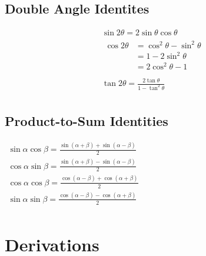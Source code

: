 \documentclass{article}
\begin{document}
\subsection{Double Angle Identites}
\begin{gather*}
	\hyperref[proof:sindouble]{
		\sin2\theta=2\sin\theta\cos\theta
	} \\
	\hyperref[proof:cosdouble]{
		\begin{aligned}
			\cos2\theta&=\cos^2\theta-\sin^2\theta \\
			&=1-2\sin^2\theta \\
			&=2\cos^2\theta-1 \\
		\end{aligned}
	} \\
	\hyperref[proof:tandouble]{
		\tan2\theta=\frac{2\tan\theta}{1-\tan^2\theta}
	} \\
\end{gather*}

\subsection{Product-to-Sum Identities}
\begin{center}
\hyperref[proof:p2s]{
	$\begin{aligned}
		\sin\alpha\cos\beta=\frac{\sin\left(\alpha+\beta\right)
			+\sin\left(\alpha-\beta\right)}{2} \\
		\cos\alpha\sin\beta=\frac{\sin\left(\alpha+\beta\right)
			-\sin\left(\alpha-\beta\right)}{2} \\
			\cos\alpha\cos\beta=\frac{\cos\left(\alpha-\beta\right)
				+\cos\left(\alpha+\beta\right)}{2} \\
		\sin\alpha\sin\beta=\frac{\cos\left(\alpha-\beta\right)
			-\cos\left(\alpha+\beta\right)}{2} \\
	\end{aligned}$
}
\end{center}







\pagebreak
\section{Derivations}
\end{document}
